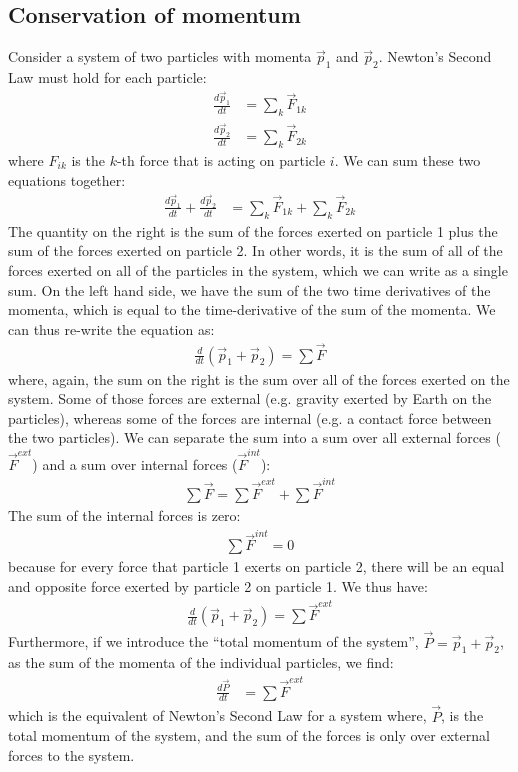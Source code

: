 \subsection{Conservation of momentum}
Consider a system of two particles with momenta $\vec p_1$ and $\vec p_2$.  Newton's Second Law must hold for each particle:
\begin{align*}
\frac{d\vec p_1}{dt}&=\sum_k \vec F_{1k}\\
\frac{d\vec p_2}{dt}&=\sum_k \vec F_{2k}
\end{align*}
where $F_{ik}$ is the $k$-th force that is acting on particle $i$.  We can sum these two equations together:
\begin{align*}
\frac{d\vec p_1}{dt}+\frac{d\vec p_2}{dt} &= \sum_k \vec F_{1k} + \sum_k \vec F_{2k}
\end{align*}
The quantity on the right is the sum of the forces exerted on particle 1 plus the sum of the forces exerted on particle 2. In other words, it is the sum of all of the forces exerted on all of the particles in the system, which we can write as a single sum. On the left hand side, we have the sum of the two time derivatives of the momenta, which is equal to the time-derivative of the sum of the momenta. We can thus re-write the equation as:
\begin{align*}
\frac{d}{dt}(\vec p_1 + \vec p_2) = \sum \vec F
\end{align*}
where, again, the sum on the right is the sum over all of the forces exerted on the system. Some of those forces are external (e.g. gravity exerted by Earth on the particles), whereas some of the forces are internal (e.g. a contact force between the two particles). We can separate the sum into a sum over all external forces ($\vec F^{ext}$) and a sum over internal forces ($\vec F^{int}$):
\begin{align*}
\sum \vec F = \sum \vec F^{ext} + \sum \vec F^{int} 
\end{align*}
The sum of the internal forces is zero:
\begin{align*}
\sum \vec F^{int} = 0
\end{align*}
because for every force that particle 1 exerts on particle 2, there will be an equal and opposite force exerted by particle 2 on particle 1. We thus have:
\begin{align*}
\frac{d}{dt}(\vec p_1 + \vec p_2) = \sum \vec F^{ext}
\end{align*}
Furthermore, if we introduce the ``total momentum of the system'', $\vec P=\vec p_1 + \vec p_2$, as the sum of the momenta of the individual particles, we find:
\begin{align*}
\frac{d\vec P}{dt} &= \sum \vec F^{ext}
\end{align*}
which is the equivalent of Newton's Second Law for a system where, $\vec P$, is the total momentum of the system, and the sum of the forces is only over external forces to the system.

